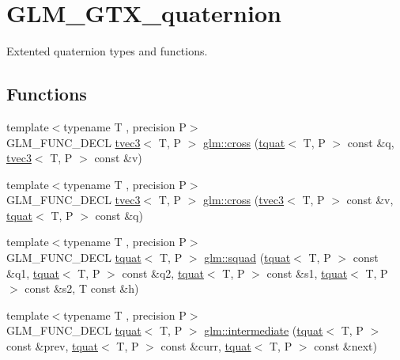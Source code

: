 \hypertarget{group__gtx__quaternion}{}\section{G\+L\+M\+\_\+\+G\+T\+X\+\_\+quaternion}
\label{group__gtx__quaternion}


Extented quaternion types and functions.  


\subsection*{Functions}
\begin{DoxyCompactItemize}
\item 
{\footnotesize template$<$typename T , precision P$>$ }\\G\+L\+M\+\_\+\+F\+U\+N\+C\+\_\+\+D\+E\+CL \hyperlink{structglm_1_1tvec3}{tvec3}$<$ T, P $>$ \hyperlink{group__gtx__quaternion_ga33ecf8ba903eee5fc09f0fbfc0d5ca6b}{glm\+::cross} (\hyperlink{structglm_1_1tquat}{tquat}$<$ T, P $>$ const \&q, \hyperlink{structglm_1_1tvec3}{tvec3}$<$ T, P $>$ const \&v)
\item 
{\footnotesize template$<$typename T , precision P$>$ }\\G\+L\+M\+\_\+\+F\+U\+N\+C\+\_\+\+D\+E\+CL \hyperlink{structglm_1_1tvec3}{tvec3}$<$ T, P $>$ \hyperlink{group__gtx__quaternion_ga4bfe3c7770fc43d14b8ef0058c4a86b5}{glm\+::cross} (\hyperlink{structglm_1_1tvec3}{tvec3}$<$ T, P $>$ const \&v, \hyperlink{structglm_1_1tquat}{tquat}$<$ T, P $>$ const \&q)
\item 
{\footnotesize template$<$typename T , precision P$>$ }\\G\+L\+M\+\_\+\+F\+U\+N\+C\+\_\+\+D\+E\+CL \hyperlink{structglm_1_1tquat}{tquat}$<$ T, P $>$ \hyperlink{group__gtx__quaternion_gae75f537becdf2b1381b4482ec96e6c82}{glm\+::squad} (\hyperlink{structglm_1_1tquat}{tquat}$<$ T, P $>$ const \&q1, \hyperlink{structglm_1_1tquat}{tquat}$<$ T, P $>$ const \&q2, \hyperlink{structglm_1_1tquat}{tquat}$<$ T, P $>$ const \&s1, \hyperlink{structglm_1_1tquat}{tquat}$<$ T, P $>$ const \&s2, T const \&h)
\item 
{\footnotesize template$<$typename T , precision P$>$ }\\G\+L\+M\+\_\+\+F\+U\+N\+C\+\_\+\+D\+E\+CL \hyperlink{structglm_1_1tquat}{tquat}$<$ T, P $>$ \hyperlink{group__gtx__quaternion_ga56abae85b3669c866e91f3c57b298b9c}{glm\+::intermediate} (\hyperlink{structglm_1_1tquat}{tquat}$<$ T, P $>$ const \&prev, \hyperlink{structglm_1_1tquat}{tquat}$<$ T, P $>$ const \&curr, \hyperlink{structglm_1_1tquat}{tquat}$<$ T, P $>$ const \&next)

\end{DoxyCompactItemize}
